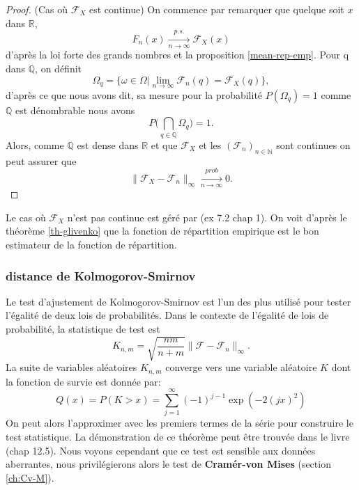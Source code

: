 \documentclass[a4paper,11pt]{article}
\begin{document}
\begin{proof} (Cas où $\mathcal{F}_X$ est continue)
	On commence par remarquer que quelque soit $x$ dans $\mathbb{R}$, \[F_{n}(x)\xrightarrow[n\to \infty]{p.s.}\mathcal{F}_X(x)\] d'après la loi forte des grands nombres et la proposition \eqref{mean-rep-emp}. Pour q dans $\mathbb{Q}$, on définit 
	\[\Omega_{q}=\{\omega \in \Omega | \lim_{n \to \infty} \mathcal{F}_{n}(q)=\mathcal{F}_X(q)\},\]
	d'après ce que nous avons dit, sa mesure pour la probabilité $P(\Omega_q)=1$ comme $\mathbb{Q}$ est dénombrable nous avons  
	\[P\Big(\bigcap_{q \in \mathbb{Q}} \Omega_q \Big)=1.\]
	Alors, comme $\mathbb{Q}$ est dense dans $\mathbb{R}$ et que $\mathcal{F}_{X}$ et les $(\mathcal{F}_n)_{n \in \mathbb{N}}$ sont continues on peut assurer que   
	\[	\|\mathcal{F}_{X}-\mathcal{F}_{n}\|_{\infty} \xrightarrow[n\to \infty]{prob} 0. \]
\end{proof}
Le cas où $\mathcal{F}_{X}$ n'est pas continue est géré par \cite{durrett2019probability} (ex 7.2 chap 1). On voit d'après le théorème \ref{th-glivenko} que la fonction de répartition empirique est le bon estimateur de la fonction de répartition. 
\subsubsection{distance de Kolmogorov-Smirnov}

Le test d'ajustement  de  Kolmogorov-Smirnov est  l'un des plus  utilisé pour tester l'égalité de deux lois  de probabilités. Dans  le  contexte de  l'égalité de lois  de probabilité, la statistique  de  test  est 
\[K_{n,m}= \sqrt{\frac{nm}{n+m}}\|\mathcal{F}-\mathcal{F}_n\|_{\infty}.\]
La suite de variables aléatoires $K_{n,m}$ converge vers une variable aléatoire $K$ dont la fonction de survie est donnée par: 
\begin{equation}
	Q(x)=P(K>x)=\sum_{j=1}^{\infty}(-1)^{j-1}\exp(-2(jx)^2)
\end{equation}
On peut alors l'approximer avec les premiers termes de la série pour construire le test statistique. La démonstration de ce théorème peut être trouvée dans le livre \cite{walker1965probability}(chap 12.5). Nous voyons cependant que ce test est sensible aux données aberrantes, nous privilégierons alors le test de \textbf{Cramér-von Mises} (section \ref{ch:Cv-M}).
\end{document}
